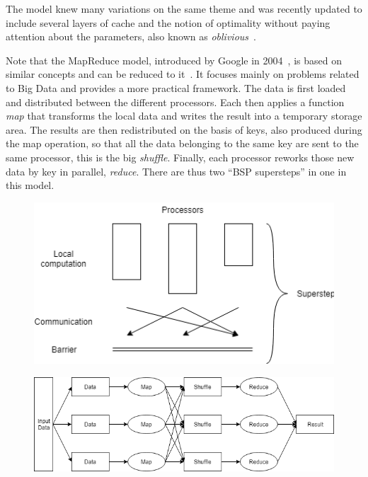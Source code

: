 The model knew many variations on the same theme and was recently updated to include several layers of cache and the notion of optimality without paying attention about the parameters, also known as \textit{oblivious}~\cite{valiant2011bridging}.

Note that the MapReduce model, introduced by Google in 2004~\cite{dean2008mapreduce}, is based on similar concepts and can be reduced to it~\cite{senger2016bsp}. It focuses mainly on problems related to Big Data and provides a more practical framework. The data is first loaded and distributed between the different processors. Each then applies a function \textit{map} that transforms the local data and writes the result into a temporary storage area. The results are then redistributed on the basis of keys, also produced during the map operation, so that all the data belonging to the same key are sent to the same processor, this is the big \textit{shuffle}. Finally, each processor reworks those new data by key in parallel, \textit{reduce}. There are thus two ``BSP supersteps'' in one in this model.

\begin{figure}[!ht]
\centering
\begin{minipage}{.5\textwidth}
  \centering
  \includegraphics[width=0.9\linewidth]{Chapters/GPU/BSP.png}
  \label{fig:BSP}
\end{minipage}%
\begin{minipage}{.5\textwidth}
  \centering
  \includegraphics[width=0.9\linewidth]{Chapters/GPU/MapReduce.png}
  \label{fig:MapReduce}
\end{minipage}
\end{figure}

